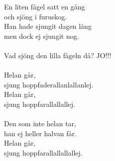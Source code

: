 
En liten fågel satt en gång \\ och sjöng i furuskog. \\ Han hade sjungit dagen lång \\ men dock ej sjungit nog. \\ \hspace{10mm} \\ Vad sjöng den lilla fågeln då? JO!!! \\ \hspace{10mm} \\ Helan går, \\ sjung hoppfaderallanlallanlej. \\ Helan går, \\ sjung hoppfarallallallej. \\ \hspace{10mm} \\ Den som inte helan tar, \\ han ej heller halvan får. \\ Helan går, \\ sjung hoppfarallallallallej.